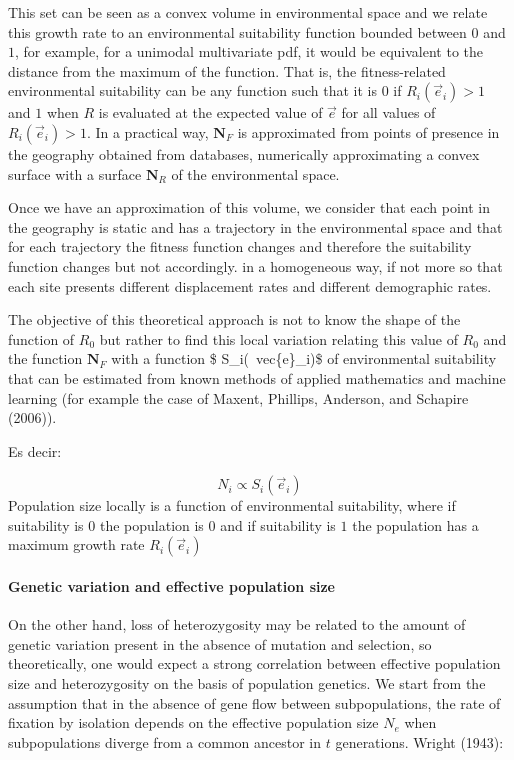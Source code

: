 \documentclass[
]{article}
\begin{document}
This set can be seen as a convex volume in environmental space and we
relate this growth rate to an environmental suitability function bounded
between \(0\) and \(1\), for example, for a unimodal multivariate pdf,
it would be equivalent to the distance from the maximum of the function.
That is, the fitness-related environmental suitability can be any
function such that it is \(0\) if \(R_i(\vec{e}_i) > 1\) and \(1\) when
\(R\) is evaluated at the expected value of \(\vec {e}\) for all values
of \(R_i(\vec{e}_i) > 1\). In a practical way, \(\mathbf{N}_F\) is
approximated from points of presence in the geography obtained from
databases, numerically approximating a convex surface with a surface
\(\mathbf{N}_R\) of the environmental space.

Once we have an approximation of this volume, we consider that each
point in the geography is static and has a trajectory in the
environmental space and that for each trajectory the fitness function
changes and therefore the suitability function changes but not
accordingly. in a homogeneous way, if not more so that each site
presents different displacement rates and different demographic rates.

The objective of this theoretical approach is not to know the shape of
the function of \(R_0\) but rather to find this local variation relating
this value of \(R_0\) and the function \(\mathbf{N}_F\) with a function
\$ S\_i(~vec\{e\}\_i)\$ of environmental suitability that can be
estimated from known methods of applied mathematics and machine learning
(for example the case of Maxent, Phillips, Anderson, and Schapire
(2006)).

Es decir:

\[
N_i \propto  S_i(\vec{e}_i)
\] Population size locally is a function of environmental suitability,
where if suitability is \(0\) the population is \(0\) and if suitability
is \(1\) the population has a maximum growth rate \(R_i(\vec{e}_i)\)

\hypertarget{genetic-variation-and-effective-population-size}{%
\paragraph{Genetic variation and effective population
size}\label{genetic-variation-and-effective-population-size}}

On the other hand, loss of heterozygosity may be related to the amount
of genetic variation present in the absence of mutation and selection,
so theoretically, one would expect a strong correlation between
effective population size and heterozygosity on the basis of population
genetics. We start from the assumption that in the absence of gene flow
between subpopulations, the rate of fixation by isolation depends on the
effective population size \(N_e\) when subpopulations diverge from a
common ancestor in \(t\) generations. Wright (1943):
\end{document}

